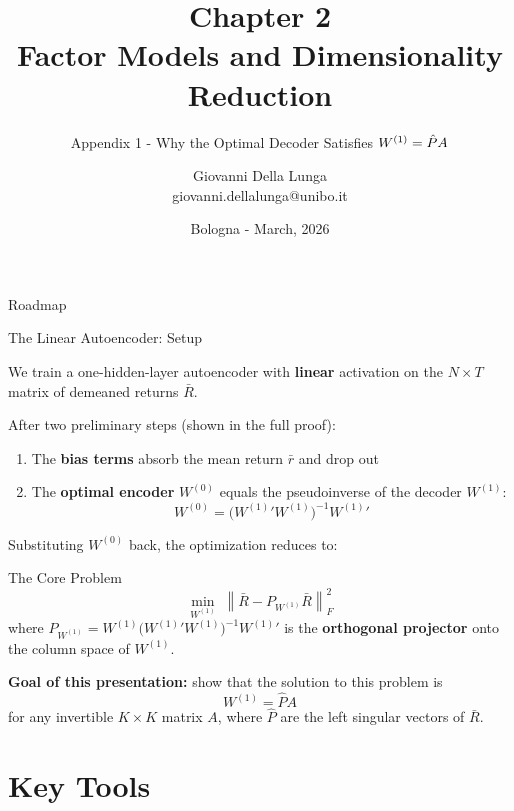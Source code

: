 \documentclass[aspectratio=169, 10pt]{beamer}
\author{Giovanni Della Lunga\\{\footnotesize giovanni.dellalunga@unibo.it}}
\title{Chapter 2\\Factor Models and Dimensionality Reduction}
\subtitle{Appendix 1 - Why the Optimal Decoder Satisfies $\Wone = \Phat A$} %
\institute{Advanced Topics in Artificial Intelligence}
\date{Bologna - March, 2026}
\newcommand{\Rbar}{\bar{R}}
\newcommand{\Phat}{\hat{P}}
\newcommand{\Wone}{W^{(1)}}
\newcommand{\Wzero}{W^{(0)}}
\newcommand{\Pw}{P_{W^{(1)}}}
\newcommand{\norm}[1]{\left\|#1\right\|_F}
\begin{document}
%
%
\begin{frame}
\titlepage
\end{frame}
%
%
\begin{frame}{Roadmap}
\tableofcontents
\end{frame}
%
%
\begin{frame}{The Linear Autoencoder: Setup}

We train a one-hidden-layer autoencoder with \textbf{linear} activation on the
$N \times T$ matrix of demeaned returns $\Rbar$.

\medskip
After two preliminary steps (shown in the full proof):
\begin{enumerate}
  \item The \textbf{bias terms} absorb the mean return $\bar{r}$ and drop out
  \item The \textbf{optimal encoder} $\Wzero$ equals the pseudoinverse of the decoder $\Wone$:
        $$\Wzero = \bigl(\Wone{}'\Wone\bigr)^{-1}\Wone{}'$$
\end{enumerate}

\medskip
Substituting $\Wzero$ back, the optimization reduces to:

\begin{block}{The Core Problem}
$$\min_{\Wone} \; \norm{\Rbar - \Pw \Rbar}^2$$
where $\Pw = \Wone\bigl(\Wone{}'\Wone\bigr)^{-1}\Wone{}'$ is the
\textbf{orthogonal projector} onto the column space of $\Wone$.
\end{block}

\medskip
\textbf{Goal of this presentation:} show that the solution to this problem is
$$\boxed{\Wone = \Phat A}$$
for any invertible $K\times K$ matrix $A$, where $\Phat$ are the left singular
vectors of $\Rbar$.

\end{frame}

\section{Key Tools}
\end{document}
